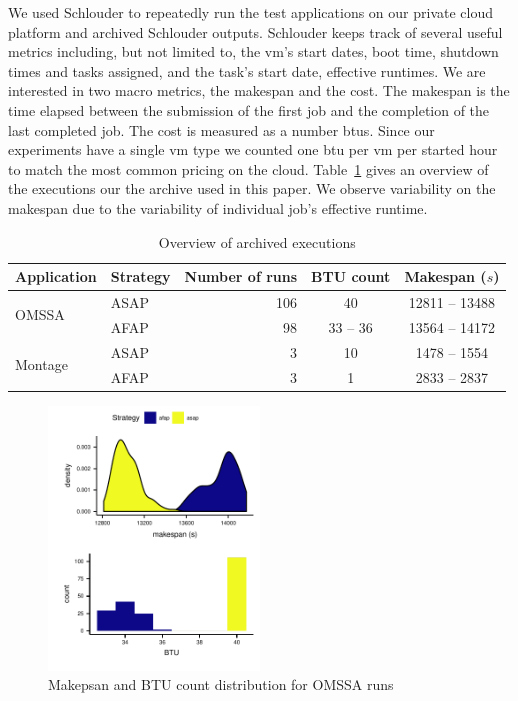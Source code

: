 \documentclass[10pt,conference,compsocconf]{IEEEtran}
\begin{document}
We used Schlouder to repeatedly run the test applications on our private cloud
platform and archived Schlouder outputs. Schlouder keeps track of several useful
metrics including, but not limited to, the \ac{vm}'s start dates, boot time,
shutdown times and tasks assigned, and the task's start date, effective
runtimes. We are interested in two macro metrics, the makespan and the cost.
The makespan is the time elapsed between the submission of the first job and the
completion of the last completed job. The cost is measured as a number
\acp{btu}. Since our experiments have a single \ac{vm} type we counted one
\ac{btu} per \ac{vm} per started hour to match the most common pricing on the
cloud. Table~\ref{tab:nbruns} gives an overview of the executions our the
archive used in this paper. We observe variability on the makespan due to the
variability of individual job's effective runtime.
\begin{table}
	\centering
	\caption{Overview of archived executions}\label{tab:nbruns}
	\begin{tabular}{llrcc}
		\toprule
		Application&Strategy&Number of runs&BTU count&Makespan ($s$)\\
		\midrule
		\multirow{2}{*}{OMSSA}&ASAP&106&40&12811 -- 13488\\
				      &AFAP&98&33 -- 36&13564 -- 14172\\
		\midrule
		\multirow{2}{*}{Montage}&ASAP&3&10&1478 -- 1554\\
					&AFAP&3&1&2833 -- 2837\\
		\bottomrule
	\end{tabular}
\end{table}
\begin{figure}
	\centering
	\includegraphics[width=0.5\textwidth]{gfx/real_brs.pdf}
	\caption{Makepsan and BTU count distribution for OMSSA
	runs\label{fig:realbrs}}
\end{figure}
\end{document}
